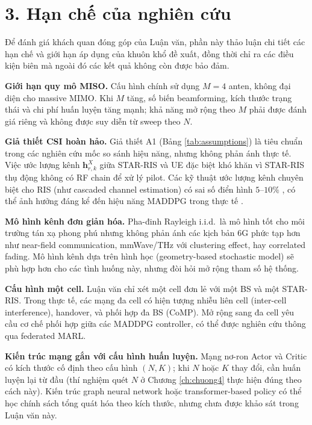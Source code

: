 \section*{3. Hạn chế của nghiên cứu}

Để đánh giá khách quan đóng góp của Luận văn, phần này thảo luận chi
tiết các hạn chế và giới hạn áp dụng của khuôn khổ đề xuất, đồng thời
chỉ ra các điều kiện biên mà ngoài đó các kết quả không còn được bảo
đảm.

\textbf{Giới hạn quy mô MISO.} Cấu hình chính sử dụng $M=4$ anten,
không đại diện cho massive MIMO. Khi $M$ tăng, số biến beamforming, kích
thước trạng thái và chi phí huấn luyện tăng mạnh; khả năng mở rộng theo $M$
phải được đánh giá riêng và không được suy diễn từ sweep theo $N$.

\textbf{Giả thiết CSI hoàn hảo.} Giả thiết A1 (Bảng \ref{tab:assumptions})
là tiêu chuẩn trong các nghiên cứu mốc so sánh hiệu năng, nhưng không
phản ánh thực tế. Việc ước lượng kênh $\mathbf{h}_{r,k}^X$ giữa STAR-RIS và
UE đặc biệt khó khăn vì STAR-RIS thụ động không có RF chain để xử lý
pilot. Các kỹ thuật ước lượng kênh chuyên biệt cho RIS (như cascaded
channel estimation) có sai số điển hình $5$--$10\%$
\cite{wu2024deep}, có thể ảnh hưởng đáng kể đến hiệu năng MADDPG trong
thực tế \cite{cernaloli2023meta}.

\textbf{Mô hình kênh đơn giản hóa.} Pha-đinh Rayleigh i.i.d.\ là mô
hình tốt cho môi trường tán xạ phong phú nhưng không phản ánh các kịch
bản 6G phức tạp hơn như near-field communication, mmWave/THz với
clustering effect, hay correlated fading. Mô hình kênh dựa trên hình
học (geometry-based stochastic model) sẽ phù hợp hơn cho các tình
huống này, nhưng đòi hỏi mở rộng tham số hệ thống.

\textbf{Cấu hình một cell.} Luận văn chỉ xét một cell đơn lẻ với một
BS và một STAR-RIS. Trong thực tế, các mạng đa cell có hiện tượng nhiễu
liên cell (inter-cell interference), handover, và phối hợp đa BS
(CoMP). Mở rộng sang đa cell yêu cầu cơ chế phối hợp giữa các MADDPG
controller, có thể được nghiên cứu thông qua federated MARL.

\textbf{Kiến trúc mạng gắn với cấu hình huấn luyện.} Mạng nơ-ron
Actor và Critic có kích thước cố định theo cấu hình $(N, K)$; khi
$N$ hoặc $K$ thay đổi, cần huấn luyện lại từ đầu (thí nghiệm quét
$N$ ở Chương \ref{ch:chuong4} thực hiện đúng theo cách này). Kiến
trúc graph neural network hoặc transformer-based policy có thể học
chính sách tổng quát hóa theo kích thước, nhưng chưa được khảo sát
trong Luận văn này.

